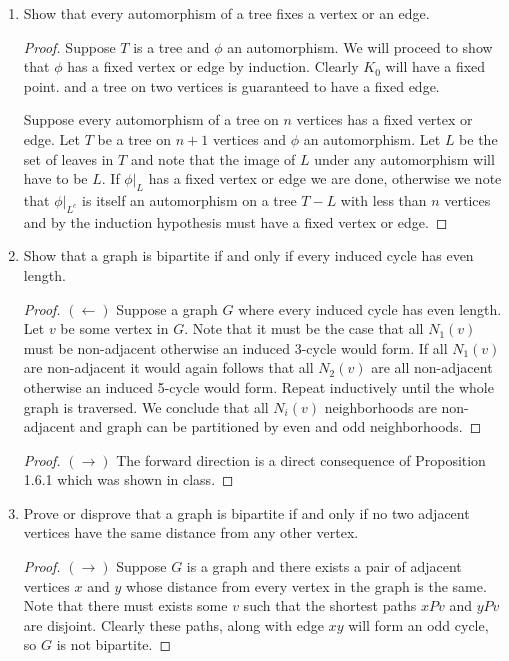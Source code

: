 \documentclass[12pt]{article}
\begin{document}
\begin{enumerate}
	\item Show that every automorphism of a tree fixes a vertex or an edge.\\ 
	\begin{proof} Suppose $T$ is a tree and $\phi$ an automorphism. We will proceed to 
		show that $\phi$ has a fixed vertex or edge by induction. Clearly $K_0$ will have a fixed point. 
		and a tree on two vertices is guaranteed to have a fixed edge.

		Suppose every automorphism of a tree on $n$ vertices has a fixed vertex or edge. Let 
		$T$ be a tree on $n+1$ vertices and $\phi$ an automorphism. Let $L$ be the set of leaves in 
		$T$ and note that the image of $L$ under any automorphism will have to be $L$. If $\phi|_L$ has a fixed vertex or edge we are done, otherwise we note that $\phi|_{L^c}$ is itself an automorphism on a tree $T - L$ with less than $n$ vertices and by the induction hypothesis must have a fixed vertex or edge. 
	\end{proof}
	\newpage

	

	\item Show that a graph is bipartite if and only if every induced cycle has even length.
	\begin{proof} $(\leftarrow)$ Suppose a graph $G$ where every induced cycle has even length. Let $v$ be some vertex in $G$. Note that it must be the case that all $N_1(v)$ must be non-adjacent otherwise an induced 3-cycle would form. If all $N_1(v)$ are non-adjacent it would again follows that all $N_2(v)$ are all non-adjacent otherwise an induced 5-cycle would form. Repeat inductively until the whole graph is traversed. We conclude that all $N_i(v)$ neighborhoods are non-adjacent and 
	graph can be partitioned by even and odd neighborhoods. 
	\end{proof}

	\begin{proof} $(\rightarrow)$ The forward direction is a direct consequence of Proposition 1.6.1 which was shown in class. 
	\end{proof}
	\newpage


	\item Prove or disprove that a graph is bipartite if and only if no two adjacent vertices have the same distance from any other vertex. 
	\begin{proof}$(\rightarrow)$ Suppose $G$ is a graph and there exists a pair of adjacent vertices $x$ and $y$ whose distance from every vertex in the graph is the same. Note that there must exists some $v$ such that the shortest paths $xPv$ and $yPv$ are disjoint. Clearly these paths, along with edge $xy$ will form an odd cycle, so $G$ is not bipartite. 		
	\end{proof}



\end{enumerate}
\end{document}
